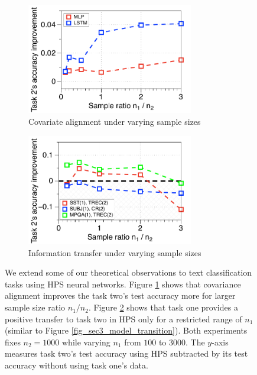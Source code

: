 \begin{figure}[!t]
	\begin{subfigure}[t]{0.5\textwidth}
		\centering
		\vspace{0pt}
		\includegraphics[width=0.8\textwidth]{figures/fig3b.pdf}
		\caption{Covariate alignment under varying sample sizes}
		\label{fig_ab_cov}
	\end{subfigure}\hfill
	\begin{subfigure}[t]{0.5\textwidth}
		\centering
		\vspace{0pt}
		\includegraphics[width=0.8\textwidth]{figures/fig3a.pdf}
		\caption{Information transfer under varying sample sizes}
		\label{fig_ab_data}
	\end{subfigure}
	\caption{
	We extend some of our theoretical observations to text classification tasks using HPS neural networks.
	Figure \ref{fig_ab_cov} shows that covariance alignment improves the task two's test accuracy more for larger sample size ratio $n_1 / n_2$.
 	Figure \ref{fig_ab_data} shows that task one provides a positive transfer to task two in HPS only for a restricted range of $n_1$ (similar to Figure \ref{fig_sec3_model_transition}).
    Both experiments fixes $n_2 = 1000$ while varying $n_1$ from $100$ to $3000$.
	The $y$-axis measures task two's test accuracy using HPS subtracted by its test accuracy without using task one's data.}
	\label{fig_text}
\end{figure}


